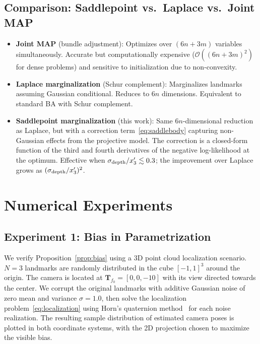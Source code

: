 \documentclass[journal]{IEEEtran}
\begin{document}
\subsection{Comparison: Saddlepoint vs.\ Laplace vs.\ Joint MAP}

\begin{itemize}
\item \textbf{Joint MAP} (bundle adjustment): 
Optimizes over $(6n + 3m)$ variables simultaneously. 
Accurate but computationally expensive ($\mathcal{O}((6n+3m)^2)$ 
for dense problems) and sensitive to initialization 
due to non-convexity.

\item \textbf{Laplace marginalization} (Schur complement): 
Marginalizes landmarks assuming Gaussian conditional. 
Reduces to $6n$ dimensions. Equivalent to standard 
BA with Schur complement.

\item \textbf{Saddlepoint marginalization} (this work): 
Same $6n$-dimensional reduction as Laplace, but with 
a correction term~\eqref{eq:saddlebody} capturing 
non-Gaussian effects from the projective model. 
The correction is a closed-form function of the 
third and fourth derivatives of the negative 
log-likelihood at the optimum.
Effective when $\sigma_{\rm depth}/x_3' \lesssim 0.3$;
the improvement over Laplace grows as 
$(\sigma_{\rm depth}/x_3')^2$.
\end{itemize}

\section{Numerical Experiments}
\label{sec:experiments}
 
\subsection{Experiment 1: Bias in Parametrization}
 
We verify Proposition~\ref{prop:bias} using a 
3D point cloud localization scenario. $N = 3$ landmarks are
randomly distributed in the cube $[-1,1]^3$ around the origin.
The camera is located at $\mathbf{T}_{f_0} = [0,0,-10]$ with 
its view directed towards the center. We corrupt the original 
landmarks with additive Gaussian noise of zero mean and 
variance $\sigma = 1.0$, then solve the localization 
problem~\eqref{eq:localization} using Horn's quaternion 
method~\cite{Horn87} for each noise realization.
The resulting sample distribution of estimated camera poses 
is plotted in both coordinate systems, with the 2D projection
chosen to maximize the visible bias.
 
\end{document}
